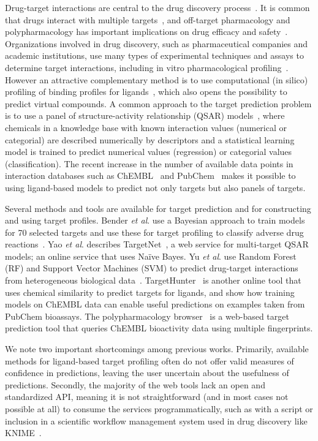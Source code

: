 \documentclass[utf8]{frontiersSCNS} %
\begin{document}
Drug-target interactions are central to the drug discovery
process~\cite{Yildirim:2007vh}. It is common that drugs interact with multiple
targets~\cite{hopkins2008network}, and off-target pharmacology and
polypharmacology has important implications on drug efficacy and
safety~\cite{Peters:2013yg,Ravikumar:2018qd}. Organizations involved in drug
discovery, such as pharmaceutical companies and academic institutions, use many
types of experimental techniques and assays to determine target interactions,
including in vitro pharmacological profiling~\cite{Bowes2012}. However an
attractive complementary method is to use computational (in silico) profiling
of binding profiles for ligands~\cite{Cereto-Massague:2015px}, which also opens the possibility
to predict virtual compounds. A common approach to the target prediction
problem is to use a panel of structure-activity relationship (QSAR)
models~\cite{HanschQSAR}, where chemicals in a knowledge base with known
interaction values (numerical or categorial) are described numerically by
descriptors and a statistical learning model is trained to predict numerical
values (regression) or categorial values (classification). The recent increase
in the number of available data points in interaction databases such as ChEMBL~\cite{Gaulton:2017tm} and
PubChem~\cite{Wang:2017cy} makes it possible to using ligand-based models to predict not only targets but also panels of targets.

Several methods and tools are available for target prediction and for
constructing and using target profiles.
%
Bender \textit{et al}. use a Bayesian approach to train models for 70 selected targets
and use these for target profiling to classify adverse drug
reactions~\cite{Bender:2007ib}.
%
Yao \textit{et al}. describes TargetNet~\cite{Yao:2016ij}, a web service for
multi-target QSAR models; an online service that uses Na\"ive Bayes.
%
Yu \textit{et al}. use Random Forest (RF) and Support Vector Machines (SVM) to predict
drug-target interactions from heterogeneous biological data~\cite{Yu:2012ol}.
%
TargetHunter~\cite{Wang:2013le} is another online tool that uses chemical
similarity to predict targets for ligands, and show how training models on
ChEMBL data can enable useful predictions on examples taken from PubChem
bioassays.
%
The polypharmacology browser~\cite{Awale:2017is} is a web-based target
prediction tool that queries ChEMBL bioactivity data using multiple
fingerprints.


We note two important shortcomings among previous works. Primarily, available
methods for ligand-based target profiling often do not offer valid measures of
confidence in predictions, leaving the user uncertain about the usefulness of
predictions. Secondly, the majority of the web tools lack an open and
standardized API, meaning it is not straightforward (and in most cases not
possible at all) to consume the services programmatically, such as with a
script or inclusion in a scientific workflow management system used in drug discovery like
KNIME~\cite{Mazanetz:2012gy}.
\end{document}

